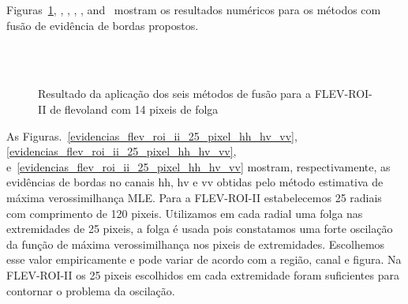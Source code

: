 Figuras~\ref{fusion_flev_roi_ii_met}, , , , , and~ mostram os resultados numéricos para os métodos com fusão de evidência de bordas propostos.
\begin{figure}[hbt]
	\centering
     \\
     \\
     \caption{Resultado da aplicação dos seis métodos de fusão para a FLEV-ROI-II de flevoland com 14 pixeis de folga}
     \label{fusion_flev_roi_ii_met}
\end{figure}
\clearpage
As Figuras.~\ref{evidencias_flev_roi_ii_25_pixel_hh_hv_vv}, \ref{evidencias_flev_roi_ii_25_pixel_hh_hv_vv}, e~\ref{evidencias_flev_roi_ii_25_pixel_hh_hv_vv} mostram, respectivamente, as evidências de bordas no canais $\text{hh}$, $\text{hv}$ e $\text{vv}$ obtidas pelo método estimativa de máxima verossimilhança MLE. Para a FLEV-ROI-II estabelecemos 25 radiais com comprimento de 120 pixeis. Utilizamos em cada radial uma folga nas extremidades de  25 pixeis, a folga é usada pois constatamos uma forte oscilação da função de máxima verossimilhança nos pixeis de extremidades. Escolhemos esse valor empiricamente e pode variar de acordo com a região, canal e figura. Na FLEV-ROI-II os 25 pixeis escolhidos em cada extremidade foram suficientes para contornar o problema da oscilação.  
